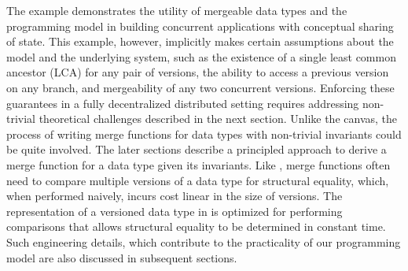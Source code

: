 The \drawsome example demonstrates the utility of mergeable data types
and the \name programming model in building concurrent applications
with conceptual sharing of state. This example, however, implicitly
makes certain assumptions about the model and the underlying system,
such as the existence of a single least common ancestor (LCA) for any
pair of versions, the ability to access a previous version on any
branch, and mergeability of any two concurrent versions. Enforcing
these guarantees in a fully decentralized distributed setting requires
addressing non-trivial theoretical challenges described in the next
section. Unlike the canvas, the process of writing merge functions for
data types with non-trivial invariants could be quite involved. The
later sections describe a principled approach to derive a merge
function for a data type given its invariants. Like ,
merge functions often need to compare multiple versions of a data type
for structural equality, which, when performed naively, incurs cost
linear in the size of versions. The representation of a versioned data
type in \name is optimized for performing comparisons that allows
structural equality to be determined in constant time. Such
engineering details, which contribute to the practicality of our
programming model are also discussed in subsequent sections.

